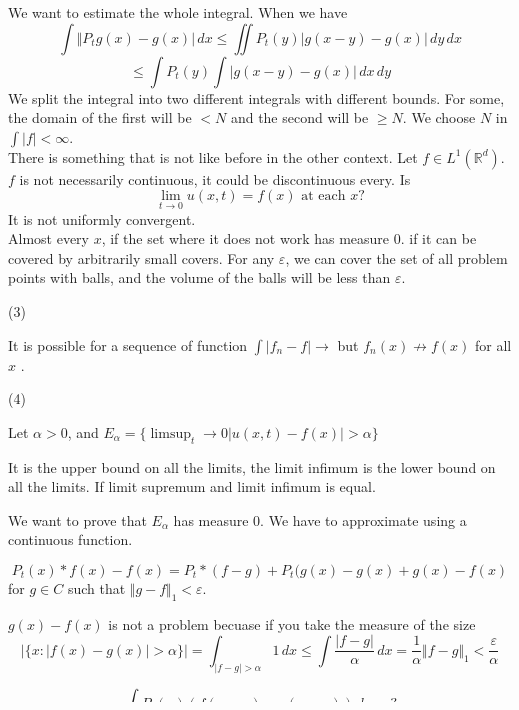 \documentclass[12pt]{article}
\begin{document}
\begin{enumerate}[itemsep=0pt, parsep=0pt, topsep=0pt, partopsep=0pt]
We want to estimate the whole integral. When we have $$\int \Vert P_tg(x) - g(x) \vert \,dx \leq \iint P_t(y) \vert g(x-y) - g(x)\vert \,dy \,dx$$
$$\leq \int P_t(y) \int \vert g(x-y) - g(x) \vert \, dx \, dy$$
We split the integral into two different integrals with different bounds. For some, the domain of the first will be $<N$ and the second will be $\geq N$. We choose $N$ in $\int \vert f \vert < \infty$. \\

\noindent There is something that is not like before in the other context. Let $f \in L^1(\mathbb{R}^d)$. $f$ is not necessarily continuous, it could be discontinuous every. Is
$$\lim_{t\rightarrow 0 }u(x,t) = f(x) \text{ at each } x ?$$
It is not uniformly convergent. \\

Almost every $x$, if the set where it does not work has measure 0. if it can be covered by arbitrarily small covers. For any $\varepsilon$, we can cover the set of all problem points with balls, and the volume of the balls will be less than $\varepsilon$. 
\end{enumerate}

(3) 

It is possible for a sequence of function $\int \vert f_n - f \vert \rightarrow$ but $f_n(x) \not\rightarrow f(x)$ for all $x$ .

(4)

Let $\alpha>0$, and $E_{\alpha} = \{ \limsup_t\rightarrow 0 \vert u(x,t) - f(x) \vert > \alpha\}$

It is the upper bound on all the limits, the limit infimum is the lower bound on all the limits. If limit supremum and limit infimum is equal. 

We want to prove that $E_\alpha$ has measure 0. We have to approximate using a continuous function. 

$$P_t(x) * f(x) - f(x) = P_t*(f-g) + P_t(g(x)-g(x) + g(x) - f(x)$$
for $g \in C$ such that $\Vert g-f \Vert_1 < \varepsilon$. 

$g(x)-f(x)$ is not a problem becuase if you take the measure of the size
$$ \vert \{ x : \vert f(x) - g(x) \vert > \alpha \} \vert = \int_{\vert f-g\vert > \alpha} 1 \,dx \leq \int \frac{\vert f-g\vert }{\alpha} \, dx
 = \frac{1}{\alpha} \Vert f-g \Vert_1 < \frac{\varepsilon}{\alpha} $$
 
$$\int P_t(y) (f(x-y)-g(x-y)) \,dx = ?$$

Hardy-Littlewood maximal function. Let $f \in L^1(\mathbb{R}^d)$, we will consider 
$$Mf(x) = \sup_{r>0}\frac{1}{\vert B_r(x)\vert}\int_{B_r(x)} \vert f(y)\vert \,dy $$
\end{document}
